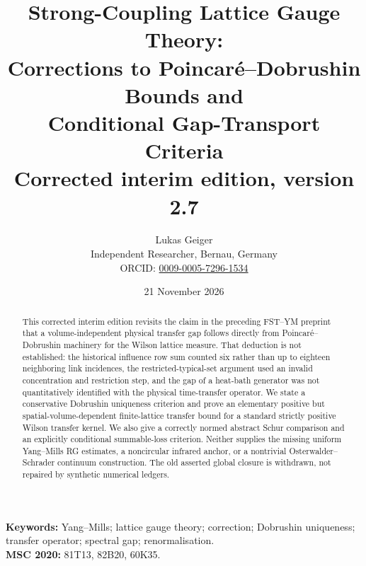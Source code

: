 \documentclass[11pt,a4paper]{article}
\title{\textbf{Strong-Coupling Lattice Gauge Theory:\\
Corrections to Poincar\'e--Dobrushin Bounds and\\
Conditional Gap-Transport Criteria}\\[4pt]
\large Corrected interim edition, version 2.7}
\author{Lukas Geiger\\
\small Independent Researcher, Bernau, Germany\\
\small ORCID: \href{https://orcid.org/0009-0005-7296-1534}{0009-0005-7296-1534}}
\date{21 November 2026}
\theoremstyle{remark}
\begin{document}
\maketitle
\thispagestyle{empty}
\begin{center}
\end{center}
\begin{abstract}
This corrected interim edition revisits the claim in the preceding
FST--YM preprint that a volume-independent physical transfer gap follows
directly from Poincar\'e--Dobrushin machinery for the Wilson lattice
measure. That deduction is not established: the historical influence
row sum counted six rather than up to eighteen neighboring link
incidences, the restricted-typical-set argument used an invalid
concentration and restriction step, and the gap of a heat-bath
generator was not quantitatively identified with the physical
time-transfer operator. We state a conservative Dobrushin uniqueness
criterion and prove an elementary positive but spatial-volume-dependent
finite-lattice transfer bound for a standard strictly positive Wilson
transfer kernel. We also give a correctly normed abstract Schur
comparison and an explicitly conditional summable-loss criterion.
Neither supplies the missing uniform Yang--Mills RG estimates, a
noncircular infrared anchor, or a nontrivial
Osterwalder--Schrader continuum construction. The old asserted global
closure is withdrawn, not repaired by synthetic numerical ledgers.
\end{abstract}
\noindent\textbf{Keywords:} Yang--Mills; lattice gauge theory; correction;
Dobrushin uniqueness; transfer operator; spectral gap; renormalisation.\\
\textbf{MSC 2020:} 81T13, 82B20, 60K35.
\clearpage
\end{document}
